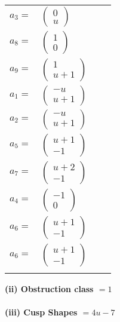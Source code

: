 \documentclass[1p]{elsarticle_modified}
\theoremstyle{definition}
\begin{document}
\begin{tabular}{m{7pt} m{180pt} m{7pt} m{180pt} }
\flushright $a_{3}=$&$\begin{pmatrix}0\\u\end{pmatrix}$ \\
\flushright $a_{8}=$&$\begin{pmatrix}1\\0\end{pmatrix}$ \\
\flushright $a_{9}=$&$\begin{pmatrix}1\\u+1\end{pmatrix}$ \\
\flushright $a_{1}=$&$\begin{pmatrix}- u\\u+1\end{pmatrix}$ \\
\flushright $a_{2}=$&$\begin{pmatrix}- u\\u+1\end{pmatrix}$ \\
\flushright $a_{5}=$&$\begin{pmatrix}u+1\\-1\end{pmatrix}$ \\
\flushright $a_{7}=$&$\begin{pmatrix}u+2\\-1\end{pmatrix}$ \\
\flushright $a_{4}=$&$\begin{pmatrix}-1\\0\end{pmatrix}$ \\
\flushright $a_{6}=$&$\begin{pmatrix}u+1\\-1\end{pmatrix}$\\ \flushright $a_{6}=$&$\begin{pmatrix}u+1\\-1\end{pmatrix}$\\&\end{tabular}
\flushleft \textbf{(ii) Obstruction class $= 1$}\\~\\
\flushleft \textbf{(iii) Cusp Shapes $= 4 u-7$}\\~\\
\end{document}
